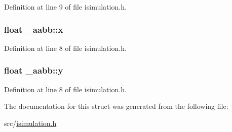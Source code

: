 Definition at line 9 of file isimulation.\-h.

\hypertarget{struct__aabb_a14157451738716a8fb2d71664a01e210}{
\subsubsection[{x}]{\setlength{\rightskip}{0pt plus 5cm}float \-\_\-aabb\-::x}}\label{struct__aabb_a14157451738716a8fb2d71664a01e210}


Definition at line 8 of file isimulation.\-h.

\hypertarget{struct__aabb_a65b0be633481856576e82098405fc9ac}{
\subsubsection[{y}]{\setlength{\rightskip}{0pt plus 5cm}float \-\_\-aabb\-::y}}\label{struct__aabb_a65b0be633481856576e82098405fc9ac}


Definition at line 8 of file isimulation.\-h.



The documentation for this struct was generated from the following file\-:\begin{DoxyCompactItemize}
\item 
src/\hyperlink{isimulation_8h}{isimulation.\-h}\end{DoxyCompactItemize}
